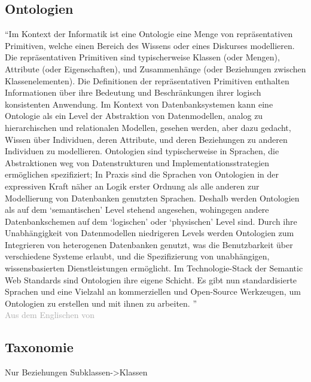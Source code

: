 \subsection{Ontologien}

\enquote{Im Kontext der Informatik ist eine Ontologie eine Menge von repräsentativen Primitiven, welche einen Bereich des Wissens oder eines Diskurses modellieren.
Die repräsentativen Primitiven sind typischerweise Klassen (oder Mengen), Attribute (oder Eigenschaften), und Zusammenhänge (oder Beziehungen zwischen Klassenelementen).
Die Definitionen der repräsentativen Primitiven enthalten Informationen über ihre Bedeutung und Beschränkungen ihrer logisch konsistenten Anwendung.
Im Kontext von Datenbanksystemen kann eine Ontologie als ein Level der Abstraktion von Datenmodellen, analog zu hierarchischen und relationalen Modellen,
gesehen werden, aber dazu gedacht, Wissen über Individuen, deren Attribute, und deren Beziehungen zu anderen Individuen zu modellieren.
Ontologien sind typischerweise in Sprachen, die Abstraktionen weg von Datenstrukturen und Implementationsstrategien ermöglichen spezifiziert;
In Praxis sind die Sprachen von Ontologien in der expressiven Kraft näher an Logik erster Ordnung als alle anderen zur Modellierung von Datenbanken genutzten Sprachen.
Deshalb werden Ontologien als auf dem \enquote{semantischen} Level stehend angesehen, wohingegen andere Datenbankschemen auf dem \enquote{logischen} oder \enquote{physischen} Level sind.
Durch ihre Unabhängigkeit von Datenmodellen niedrigeren Levels werden Ontologien zum Integrieren von heterogenen Datenbanken genutzt,
was die Benutzbarkeit über verschiedene Systeme erlaubt, und die Spezifizierung von unabhängigen, wissensbasierten  Dienstleistungen ermöglicht.
Im Technologie-Stack der Semantic Web Standards sind Ontologien ihre eigene Schicht.
Es gibt nun standardisierte Sprachen und eine Vielzahl an kommerziellen und Open-Source Werkzeugen, um Ontologien zu erstellen und mit ihnen zu arbeiten.
}\\
\textcolor{darkgray}{Aus dem Englischen von \citet{ontologygruber}}

\subsection{Taxonomie}

Nur Beziehungen Subklassen->Klassen 

